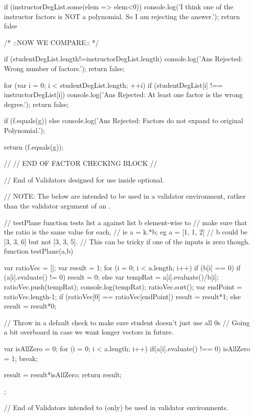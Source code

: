 \begin{javascript}
{    if (instructorDegList.some(elem => elem<0)) {
        console.log('I think one of the instructor factors is NOT a polynomial. So I am rejecting the answer.');
        return false
        }
    
   /*
        ::NOW WE COMPARE::
   */
    
    if (studentDegList.length!=instructorDegList.length){
        console.log('Ans Rejected: Wrong number of factors.');
        return false;
        }
    
    for (var i = 0; i < studentDegList.length; ++i) {
        if (studentDegList[i] !== instructorDegList[i]) {
        console.log('Ans Rejected: At least one factor is the wrong degree.');
        return false;
        }
    }

    if (f.equals(g)){
        } else {
        console.log('Ans Rejected: Factors do not expand to original Polynomial.');
        }

    return (f.equals(g));
}

//
//  END OF FACTOR CHECKING BLOCK
//





// End of Validators designed for use inside \answer optional.


// NOTE: The below are intended to be used in a validator environment, rather than the validator argument of an \answer.

// testPlane function tests list a against list b element-wise to 
// make sure that the ratio is the same value for each, 
// ie a = k.*b; eg a = [1, 1, 2] 
// b could be [3, 3, 6] but not [3, 3, 5]. 
// This can be tricky if one of the inputs is zero though.
function testPlane(a,b) {
	var ratioVec = [];
	var result = 1;
	for (i = 0; i < a.length; i++) {
		if (b[i] == 0) {
			if (a[i].evaluate() != 0){
				result = 0;
			}
		}
		else {
			var tempRat = a[i].evaluate()/b[i];
			ratioVec.push(tempRat);
			console.log(tempRat);
		}
	}
	ratioVec.sort();
	var endPoint = ratioVec.length-1;
	if (ratioVec[0] == ratioVec[endPoint]) {
		result = result*1;
	}
	else {
		result = result*0;
	}
    
    // Throw in a default check to make sure student doesn't just use all 0s
    // Going a bit overboard in case we want longer vectors in future.
    
    var isAllZero = 0;
    for (i = 0; i < a.length; i++) {
      if(a[i].evaluate() !== 0) {
        isAllZero = 1;
        break;
      }
    }
    
    result = result*isAllZero;
	return result;
};


// End of Validators intended to (only) be used in validator environments.

\end{javascript}